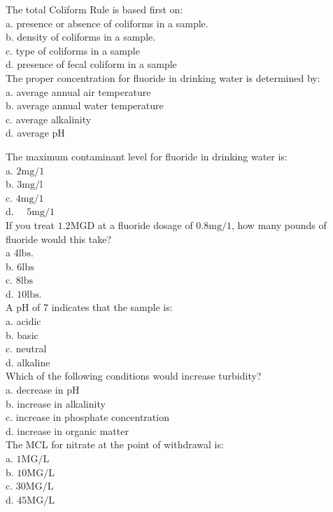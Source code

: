 The total Coliform Rule is based first on:\\
a. presence or absence of coliforms in a sample.\\
b. density of coliforms in a sample.\\
c. type of coliforms in a sample\\
d. presence of fecal coliform in a sample\\

The proper concentration for fluoride in drinking water is determined by:\\
a. average annual air temperature\\
b. average annual water temperature\\
c. average alkalinity\\
d. average $\mathrm{pH}$ 

The maximum contaminant level for fluoride in drinking water is:\\
a. $2 \mathrm{mg} / 1$\\
b. $3 \mathrm{mg} / \mathrm{l}$\\
c. $4 \mathrm{mg} / 1$\\
d. $\quad 5 \mathrm{mg} / 1$\\

If you treat $1.2 \mathrm{MGD}$ at a fluoride dosage of $0.8 \mathrm{mg} / 1$, how many pounds of fluoride would this take?\\
a $4 \mathrm{lbs}$.\\
b. $6 \mathrm{lbs}$\\
c. $8 \mathrm{lbs}$\\
d. $10 \mathrm{lbs}$.\\

A pH of 7 indicates that the sample is:\\
a. acidic\\
b. basic\\
c. neutral\\
d. alkaline\\

Which of the following conditions would increase turbidity?\\
a. decrease in $\mathrm{pH}$\\
b. increase in alkalinity\\
c. increase in phosphate concentration\\
d. increase in organic matter\\

The MCL for nitrate at the point of withdrawal is:\\
a. $1 \mathrm{MG} / \mathrm{L}$\\
b. $10 \mathrm{MG} / \mathrm{L}$\\
c. $30 \mathrm{MG} / \mathrm{L}$\\
d. $45 \mathrm{MG} / \mathrm{L}$ 

